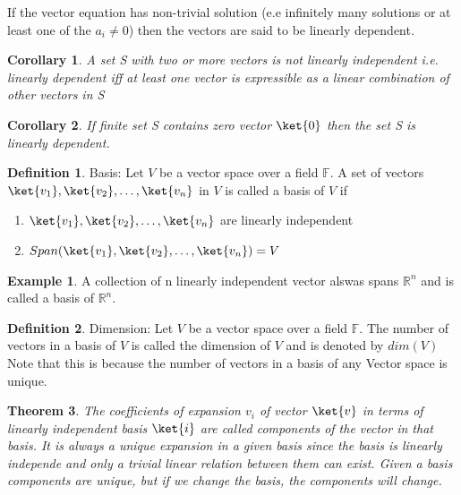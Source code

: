 \documentclass[12pt, oneside]{book}
\newtheorem{theorem}{Theorem}[section]
\newtheorem{corollary}[theorem]{Corollary}
\theoremstyle{definition}
\newtheorem{definition}{Definition}[section]
\theoremstyle{definition}
\newtheorem{example}{Example}[section]
\theoremstyle{remark}
\begin{document}
If the vector equation has non-trivial solution (e.e infinitely many solutions or at least one of the $a_i \neq 0$) then the vectors are said to be linearly dependent.

\begin{corollary}
    A set S with two or more vectors is not linearly independent i.e. linearly dependent iff at least one vector is expressible as a linear combination of other vectors in S
\end{corollary}

\begin{corollary}
    If finite set S contains zero vector $\ket{0}$ then the set S is linearly dependent.
\end{corollary}

\begin{definition}
    Basis: Let $V$ be a vector space over a field $\mathbb{F}$. A set of vectors $\ket{v_1},\ket{v_2},\ldots,\ket{v_n}$ in $V$ is called a basis of $V$ if
    \begin{enumerate}
        \item $\ket{v_1},\ket{v_2},\ldots,\ket{v_n}$ are linearly independent
        \item $Span(\ket{v_1},\ket{v_2},\ldots,\ket{v_n})=V$
    \end{enumerate}
\end{definition}

\begin{example}
    A collection of n linearly independent vector alswas spans $\mathbb{R}^n$ and is called a basis of $\mathbb{R}^n$.
\end{example}

\begin{definition}
    Dimension: Let $V$ be a vector space over a field $\mathbb{F}$. The number of vectors in a basis of $V$ is called the dimension of $V$ and is denoted by $dim(V)$
    Note that this is because the number of vectors in a basis of any Vector space is unique.
\end{definition}

\begin{theorem}
    The coefficients of expansion $v_i$ of vector $\ket{v}$ in terms of linearly independent basis $\ket{i}$ are called components of the vector in that basis.
    It is always a unique expansion in a given basis since the basis is linearly independe and only a trivial linear relation 
    between them can exist. Given a basis components are unique, but if we change the basis, the components will change.
\end{theorem}
\end{document}
